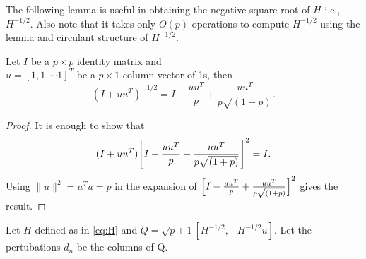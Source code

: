 The following lemma is useful in obtaining the negative square root of $H$ i.e., 
$H^{-1/2}$. Also note that it takes only $O(p)$ operations to compute $H^{-1/2}$
using the lemma and circulant structure of $H^{-1/2}$.
\begin{lemma}
 \label{lemma: gen Sherman-Morisson}
Let $I$ be a $p \times p$ identity matrix and \\
$u=[1,1, \cdots 1]^{T}$
be a $p \times 1$ column vector of 1s, then
$$ (I+uu^T)^{-1/2}= I-\frac{uu^T}{p}+\frac{uu^T}{p\sqrt{(1+p)}}.$$
\end{lemma}
\begin{proof}
It is enough to show that
$$(I+uu^T)\Bigg{[}I-\frac{uu^T}{p}+\frac{uu^T}{p\sqrt{(1+p)}}\Bigg{]}^2=I.$$
Using $\|u\|^2=u^Tu=p$ in the expansion of $\Big{[}I-\frac{uu^T}{p}+\frac{uu^T}{p\sqrt{(1+p)}}\Big{]}^2$
gives the result.
\end{proof}
Let $H$ defined as in \eqref{eq:H} and $Q=\sqrt{p+1}[H^{-1/2},-H^{-1/2}u].$
Let the pertubations $d_n$ be the columns of Q. 
